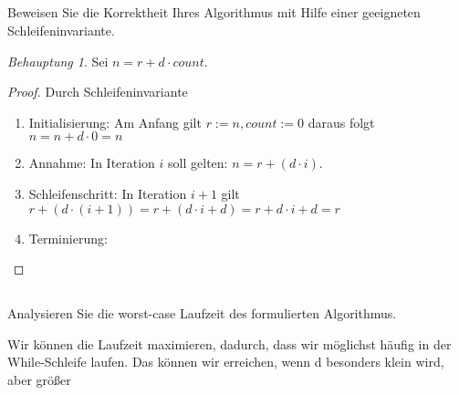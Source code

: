 \documentclass[12pt]{article}
\theoremstyle{remark}
\newtheorem*{Behauptung}{Behauptung}
\begin{document}
\subsection{} Beweisen Sie die Korrektheit Ihres Algorithmus mit Hilfe einer geeigneten Schleifeninvariante.

\begin{Behauptung}
Sei $n = r + d \cdot count$.
\end{Behauptung}

\begin{proof}
Durch Schleifeninvariante
\begin{enumerate}
    \item Initialisierung: Am Anfang gilt $r := n, count := 0$ daraus folgt $n = n + d \cdot 0 = n$
    \item Annahme: In Iteration $i$ soll gelten: $n = r + (d \cdot i)$.
    \item Schleifenschritt:
    In Iteration $i + 1$ gilt $r + (d \cdot (i + 1)) = r + (d \cdot i + d) = r + d \cdot i + d = r$
    \item Terminierung: 
\end{enumerate}
\end{proof}
\subsection{} Analysieren Sie die worst-case Laufzeit des formulierten Algorithmus.

Wir können die Laufzeit maximieren, dadurch, dass wir möglichst häufig in der While-Schleife laufen. Das können wir erreichen, wenn d besonders klein wird, aber größer 
\end{document}
